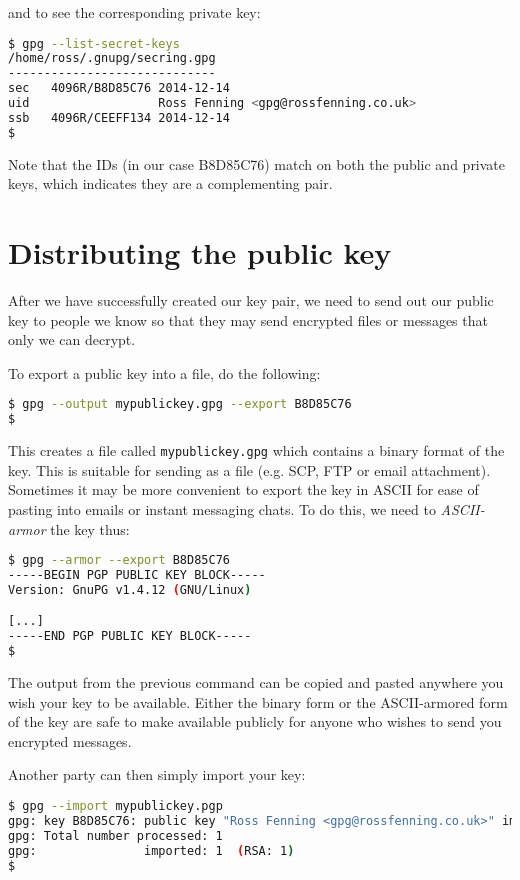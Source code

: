 \documentclass{report}
\begin{document}
\noindent and to see the corresponding private key:

\begin{lstlisting}[language=bash]
$ gpg --list-secret-keys
/home/ross/.gnupg/secring.gpg
-----------------------------
sec   4096R/B8D85C76 2014-12-14
uid                  Ross Fenning <gpg@rossfenning.co.uk>
ssb   4096R/CEEFF134 2014-12-14
$
\end{lstlisting}

Note that the IDs (in our case B8D85C76) match on both the public
and private keys, which indicates they are a complementing pair.

\section{Distributing the public key}

After we have successfully created our key pair, we need to send
out our public key to people we know so that they may send
encrypted files or messages that only we can decrypt.

To export a public key into a file, do the following:

\begin{lstlisting}[language=bash]
$ gpg --output mypublickey.gpg --export B8D85C76
$
\end{lstlisting}

This creates a file called \texttt{mypublickey.gpg} which contains
a binary format of the key. This is suitable for sending as a file
(e.g. SCP, FTP or email attachment). Sometimes it may be more
convenient to export the key in ASCII for ease of pasting into emails
or instant messaging chats. To do this, we need to \emph{ASCII-armor}
the key thus:

\begin{lstlisting}[language=bash]
$ gpg --armor --export B8D85C76
-----BEGIN PGP PUBLIC KEY BLOCK-----
Version: GnuPG v1.4.12 (GNU/Linux)

[...]
-----END PGP PUBLIC KEY BLOCK-----
$
\end{lstlisting}

The output from the previous command can be copied and pasted anywhere
you wish your key to be available. Either the binary form or the
ASCII-armored form of the key are safe to make available publicly for
anyone who wishes to send you encrypted messages.

Another party can then simply import your key:

\begin{lstlisting}[language=bash]
$ gpg --import mypublickey.pgp
gpg: key B8D85C76: public key "Ross Fenning <gpg@rossfenning.co.uk>" imported
gpg: Total number processed: 1
gpg:               imported: 1  (RSA: 1)
$
\end{lstlisting}
\end{document}
